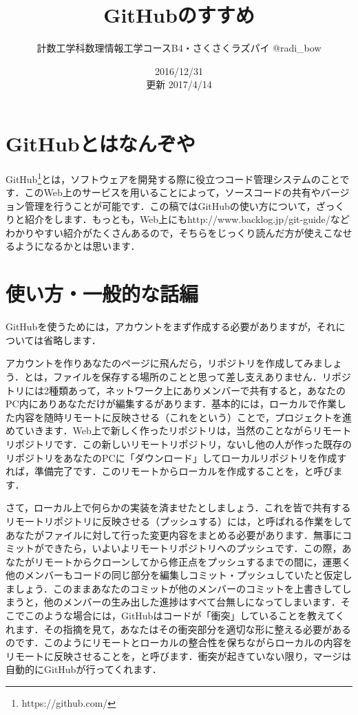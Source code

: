 \documentclass{jsarticle}
\begin{document}
\title{GitHubのすすめ}
\author{計数工学科数理情報工学コースB4・さくさくラズパイ @radi\_bow}
\date{2016/12/31 \\ 更新 2017/4/14}
\maketitle

\section{GitHubとはなんぞや}
GitHub\footnote{https://github.com/}とは，ソフトウェアを開発する際に役立つコード管理システムのことです．このWeb上のサービスを用いることによって，ソースコードの共有やバージョン管理を行うことが可能です．この稿ではGitHubの使い方について，ざっくりと紹介をします．もっとも，Web上にもhttp://www.backlog.jp/git-guide/などわかりやすい紹介がたくさんあるので，そちらをじっくり読んだ方が使えこなせるようになるかとは思います．
\section{使い方・一般的な話編}
GitHubを使うためには，アカウントをまず作成する必要がありますが，それについては省略します．

アカウントを作りあなたのページに飛んだら，リポジトリを作成してみましょう．とは，ファイルを保存する場所のことと思って差し支えありません．リポジトリには2種類あって，ネットワーク上にありメンバーで共有すると，あなたのPC内にありあなただけが編集するがあります．基本的には，ローカルで作業した内容を随時リモートに反映させる（これをという）ことで，プロジェクトを進めていきます．Web上で新しく作ったリポジトリは，当然のことながらリモートリポジトリです．この新しいリモートリポジトリ，ないし他の人が作った既存のリポジトリをあなたのPCに「ダウンロード」してローカルリポジトリを作成すれば，準備完了です．このリモートからローカルを作成することを，と呼びます．

さて，ローカル上で何らかの実装を済ませたとしましょう．これを皆で共有するリモートリポジトリに反映させる（プッシュする）には，と呼ばれる作業をしてあなたがファイルに対して行った変更内容をまとめる必要があります．無事にコミットができたら，いよいよリモートリポジトリへのプッシュです．この際，あなたがリモートからクローンしてから修正点をプッシュするまでの間に，運悪く他のメンバーもコードの同じ部分を編集しコミット・プッシュしていたと仮定しましょう．このままあなたのコミットが他のメンバーのコミットを上書きしてしまうと，他のメンバーの生み出した進捗はすべて台無しになってしまいます．そこでこのような場合には，GitHubはコードが「衝突」していることを教えてくれます．その指摘を見て，あなたはその衝突部分を適切な形に整える必要があるのです．このようにリモートとローカルの整合性を保ちながらローカルの内容をリモートに反映させることを，と呼びます．衝突が起きていない限り，マージは自動的にGitHubが行ってくれます．
\end{document}
